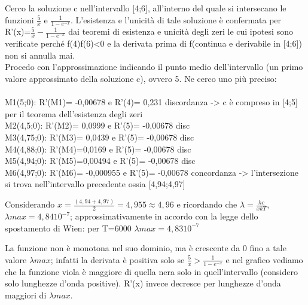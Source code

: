 \documentclass{article}
\theoremstyle{definition}
\begin{document}
\begin{minipage}{0.5\textwidth}
Cerco la soluzione c nell'intervallo [4;6], all'interno del quale si intersecano le funzioni \(\frac{5}{x}\) e \(\frac{1}{1-e^{-x}}\). L'esistenza e l'unicità di tale soluzione è confermata per R'(x)=\(\frac{5}{x}-\frac{1}{1-e^{-x}}\) dai teoremi di esistenza e unicità degli zeri le cui ipotesi sono verificate perché f(4)f(6)<0 e la derivata prima di f(continua e derivabile in [4;6]) non si annulla mai.\\
Procedo con l'approssimazione indicando il punto medio dell'intervallo (un primo valore approssimato della soluzione c), ovvero 5. Ne cerco uno più preciso:\\
\\
M1(5;0): R'(M1)= -0,00678 e R'(4)= 0,231 discordanza -> c è compreso in [4;5] per il teorema dell'esistenza degli zeri\\
M2(4,5;0): R'(M2)= 0,0999 e R'(5)= -0,00678 disc\\
M3(4,75;0): R'(M3)= 0,0439 e R'(5)= -0,00678 disc\\
M4(4,88;0): R'(M4)=0,0169 e R'(5)= -0,00678 disc\\
M5(4,94;0): R'(M5)=0,00494 e R'(5)= -0,00678 disc\\
M6(4,97;0): R'(M6)= -0,000955 e R'(5)= -0,00678 concordanza -> l'intersezione si trova nell'intervallo precedente ossia [4,94;4,97]\\
\end{minipage}

\vspace{0.5cm}

Considerando \(x=\frac{\left ( 4,94+4,97 \right )}{2}=4,955\approx 4,96\) e ricordando che \(\lambda =\frac{h c}{x k T}\), \(\lambda max = 4,84 10^{-7}\); approssimativamente in accordo con la legge dello spostamento di Wien: per T=6000 \(\lambda max= 4,83 10^{-7}\)

La funzione non è monotona nel suo dominio, ma è crescente da 0 fino a tale valore \(\lambda max\); infatti la derivata è positiva solo se \(\frac{5}{x}>\frac{1}{1-e^{-x}}\) e nel grafico vediamo che la funzione viola è maggiore di quella nera solo in quell'intervallo (considero solo lunghezze d'onda positive). R'(x) invece decresce per lunghezze d'onda maggiori di \(\lambda max\).
\end{document}
